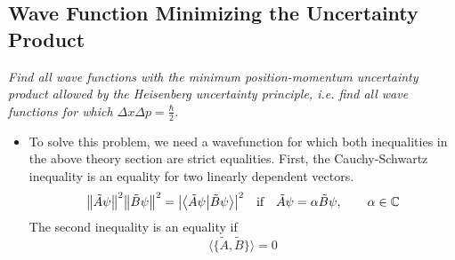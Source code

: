 \documentclass[11pt, a4paper]{article}
\begin{document}
\subsection{Wave Function Minimizing the Uncertainty Product}
\textit{Find all wave functions with the minimum position-momentum uncertainty product allowed by the Heisenberg uncertainty principle, i.e. find all wave functions for which $ \Delta x \Delta p = \frac{\hbar}{2} $}.
\begin{itemize}
	\item To solve this problem, we need a wavefunction for which both inequalities in the above theory section are strict equalities. First, the Cauchy-Schwartz inequality is an equality for two linearly dependent vectors.
	\begin{equation*}
		\norm{\tilde{A}\psi}^{2}\norm{\tilde{B}\psi}^{2} = \abs{\braket{\tilde{A}\psi}{\tilde{B}\psi}}^{2} \quad \text{if} \quad \tilde{A}\psi = \alpha \tilde{B}\psi, \qquad \alpha \in \mathbb{C}
	\end{equation*}
	The second inequality is an equality if 
	\begin{equation*}
		\big\langle \big\{\tilde{A}, \tilde{B}\big\} \big\rangle = 0
	\end{equation*}
	

\end{itemize}
\end{document}

